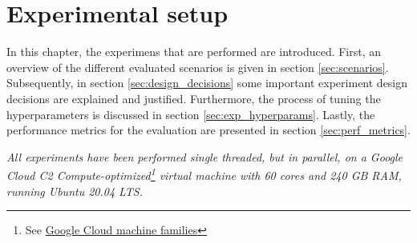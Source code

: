 \chapter{Experimental setup}
\label{ch:setup}









In this chapter, the experimens that are performed are introduced. First, an overview of the different evaluated scenarios is given in section \ref{sec:scenarios}. Subsequently, in section \ref{sec:design_decisions} some important experiment design decisions are explained and justified. Furthermore, the process of tuning the hyperparameters is discussed in section \ref{sec:exp_hyperparams}. Lastly, the performance metrics for the evaluation are presented in section \ref{sec:perf_metrics}.

\emph{All experiments have been performed single threaded, but in parallel, on a Google Cloud C2 Compute-optimized\footnote{See \href{https://cloud.google.com/compute/docs/machine-types}{Google Cloud machine families}} virtual machine with 60 cores and 240 GB RAM, running Ubuntu 20.04 LTS.}


